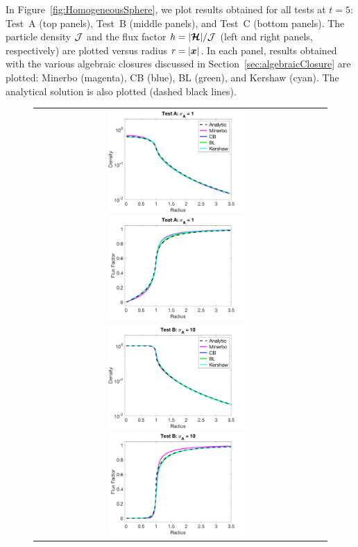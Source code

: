 In Figure~\ref{fig:HomogeneousSphere}, we plot results obtained for all tests at $t=5$: Test~A (top panels), Test~B (middle panels), and Test~C (bottom panels).  
The particle density $\mathcal{J}$ and the flux factor $h=|\boldsymbol{\mathcal{H}}|/\mathcal{J}$ (left and right panels, respectively) are plotted versus radius $r=|\boldsymbol{x}|$.  
In each panel, results obtained with the various algebraic closures discussed in Section~\ref{sec:algebraicClosure} are plotted: Minerbo (magenta), CB (blue), BL (green), and Kershaw (cyan).  
The analytical solution is also plotted (dashed black lines).  
\begin{figure}[H]
  \centering
  \begin{tabular}{cc}
    \includegraphics[width=0.5\textwidth]{figures/HomogeneousSphere_ClosureComparison_Chi_1e0_Density}
    \includegraphics[width=0.5\textwidth]{figures/HomogeneousSphere_ClosureComparison_Chi_1e0_FluxFactor} \\
    \includegraphics[width=0.5\textwidth]{figures/HomogeneousSphere_ClosureComparison_Chi_1e1_Density}
    \includegraphics[width=0.5\textwidth]{figures/HomogeneousSphere_ClosureComparison_Chi_1e1_FluxFactor} \\

\end{tabular}
\end{figure}
